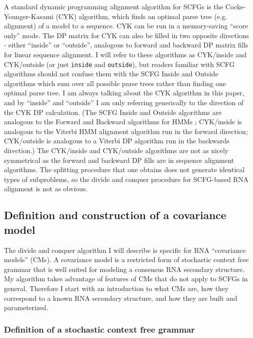 \documentclass[11pt]{article}
\begin{document}
A standard dynamic programming alignment algorithm for SCFGs is the
Cocke-Younger-Kasami (CYK) algorithm, which finds an optimal parse
tree (e.g. alignment) of a model to a sequence. CYK can be run in a
memory-saving ``score only'' mode. The DP matrix for CYK can also be
filled in two opposite directions - either ``inside'' or ``outside'',
analogous to forward and backward DP matrix fills for linear sequence
alignment.  I will refer to these algorithms as CYK/inside and
CYK/outside (or just \texttt{inside} and \texttt{outside}), but
readers familiar with SCFG algorithms should not confuse them with the
SCFG Inside and Outside algorithms \cite{Lari90,Lari91} which sum over
all possible parse trees rather than finding one optimal parse tree. I
am always talking about the CYK algorithm in this paper, and by
``inside'' and ``outside'' I am only referring generically to the
direction of the CYK DP calculation. (The SCFG Inside and Outside
algorithms are analogous to the Forward and Backward algorithms for
HMMs \cite{Rabiner89,Durbin98}; CYK/inside is analogous to the Viterbi
HMM alignment algorithm run in the forward direction; CYK/outside is
analogous to a Viterbi DP algorithm run in the backwards direction.)
The CYK/inside and CYK/outside algorithms are not as nicely
symmetrical as the forward and backward DP fills are in sequence
alignment algorithms. The splitting procedure that one obtains does
not generate identical types of subproblems, so the divide and conquer
procedure for SCFG-based RNA alignment is not as obvious.

\subsection{Definition and construction of a covariance model}

The divide and conquer algorithm I will describe is specific for RNA
``covariance models'' (CMs). A covariance model is a restricted form
of stochastic context free grammar that is well suited for modeling a
consensus RNA secondary structure\cite{Eddy94,Durbin98}. My algorithm
takes advantage of features of CMs that do not apply to SCFGs in
general.  Therefore I start with an introduction to what CMs are, how
they correspond to a known RNA secondary structure, and how they are
built and parameterized.

\subsubsection{Definition of a stochastic context free grammar}
\end{document}

